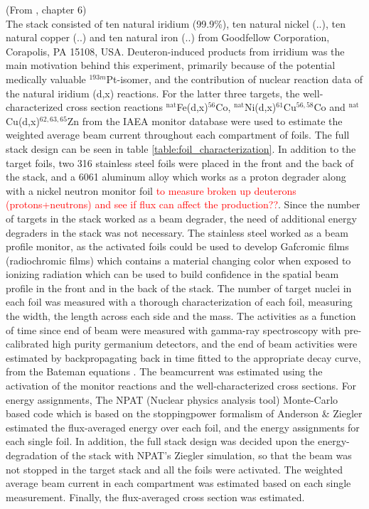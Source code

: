 (From \cite{KraneKennethS.Halliday1987}, chapter 6) \\


\noindent
 The stack consisted of ten natural iridium (99.9\%), ten natural nickel (..), ten natural copper (..) and ten natural iron (..) from Goodfellow Corporation, Corapolis, PA 15108, USA. Deuteron-induced products from irridium was the main motivation behind this experiment, primarily because of the potential medically valuable $^{193m}$Pt-isomer, and the contribution of nuclear reaction data of the natural iridium (d,x) reactions. For the latter three targets, the well-characterized cross section reactions $^\text{nat}$Fe(d,x)$^{56}$Co, $^\text{nat}$Ni(d,x)$^{61}$Cu$^{56,58}$Co and $^\text{nat}$Cu(d,x)$^{62,63,65}$Zn from the IAEA monitor database\cite{Hermanne2018a} were used to estimate the weighted average beam current throughout each compartment of foils. The full stack design can be seen in table \ref{table:foil_characterization}. In addition to the target foils, two 316 stainless steel foils were placed in the front and the back of the stack, and a 6061 aluminum alloy which works as a proton degrader along with a nickel neutron monitor foil \textcolor{red}{to measure broken up deuterons (protons+neutrons) and see if flux can affect the production??}. Since the number of targets in the stack worked as a beam degrader, the need of additional energy degraders in the stack was not necessary. The stainless steel worked as a beam profile monitor, as the activated foils could be used to develop Gafcromic films (radiochromic films) which contains a material changing color when exposed to ionizing radiation which can be used to build confidence in the spatial beam profile in the front and in the back of the stack. The number of target nuclei in each foil was measured with a thorough characterization of each foil, measuring the width, the length across each side and the mass. The activities as a function of time since end of beam were measured with gamma-ray spectroscopy with pre-calibrated high purity germanium detectors, and the end of beam activities were estimated by backpropagating back in time fitted to the appropriate decay curve, from the Bateman equations \cite{PopO.M.SimulikV.M.2016}. The beamcurrent was estimated using the activation of the monitor reactions and the well-characterized cross sections. For energy assignments, The NPAT (Nuclear physics analysis tool) Monte-Carlo based code which is based on the stoppingpower formalism of Anderson \& Ziegler \cite{MorellJ., Ziegler1999} estimated the flux-averaged energy over each foil, and the energy assignments for each single foil. In addition, the full stack design was decided upon the energy-degradation of the stack with NPAT's Ziegler simulation, so that the beam was not stopped in the target stack and all the foils were activated. The weighted average beam current in each compartment was estimated based on each single measurement. Finally, the flux-averaged cross section was estimated. \\

